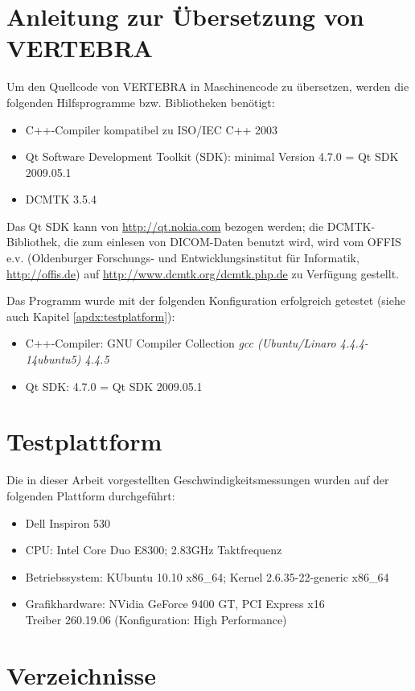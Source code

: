 \documentclass[pdftex,a4paper,titlepage,12pt]{scrartcl}
\newtheorem[L]{boxedDefinition}{Definition}
\begin{document}
\section{Anleitung zur Übersetzung von VERTEBRA}
Um den Quellcode von VERTEBRA in Maschinencode zu übersetzen, werden die folgenden Hilfsprogramme bzw. Bibliotheken benötigt:
\begin{itemize}
 \item C++-Compiler kompatibel zu ISO/IEC C++ 2003
 \item Qt Software Development Toolkit (SDK): minimal Version 4.7.0 = Qt SDK 2009.05.1
 \item DCMTK 3.5.4
\end{itemize}

Das Qt SDK kann von \url{http://qt.nokia.com} bezogen werden; die DCMTK-Bibliothek, die zum einlesen von DICOM-Daten benutzt wird, wird vom OFFIS e.v. (Oldenburger Forschungs- und Entwicklungsinstitut für Informatik, \url{http://offis.de}) auf \url{http://www.dcmtk.org/dcmtk.php.de} zu Verfügung gestellt.

Das Programm wurde mit der folgenden Konfiguration erfolgreich getestet (siehe auch Kapitel \vref{apdx:testplatform}):
\begin{itemize}
 \item C++-Compiler: GNU Compiler Collection \textit{gcc (Ubuntu/Linaro 4.4.4-14ubuntu5) 4.4.5}
 \item Qt SDK: 4.7.0 = Qt SDK 2009.05.1
\end{itemize}

\section{Testplattform}\label{apdx:testplatform}
Die in dieser Arbeit vorgestellten Geschwindigkeitsmessungen wurden auf der folgenden Plattform durchgeführt:
\begin{itemize}
  \item Dell Inspiron 530
  \item CPU: Intel\textsuperscript{\textregistered} Core Duo E8300; 2.83GHz Taktfrequenz
  \item Betriebssystem: KUbuntu 10.10 x86\_64; Kernel 2.6.35-22-generic x86\_64
  \item Grafikhardware: NVidia\textsuperscript{\textregistered} GeForce 9400 GT, PCI Express x16\\
	Treiber 260.19.06 (Konfiguration: High Performance)
\end{itemize}
\newpage
\section{Verzeichnisse}
\listoffigures
\renewcommand\refname{Literatur- und Quellenverzeichnis}


\clearpage
\end{document}

